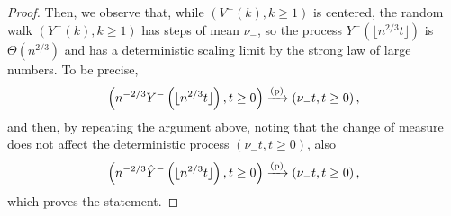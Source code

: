 \begin{proof}
 Then, we observe that, while $(V^-(k),k\geq 1)$ is centered, the random walk  $(Y^-(k),k\geq 1)$ has steps of mean $\nu_-$, so the process $Y^-\left(\lfloor n^{2/3}t\rfloor\right)$  is $\Theta(n^{2/3})$ and has a deterministic scaling limit by the strong law of large numbers. To be precise,
 $$\left(n^{-2/3}Y^-\left(\lfloor n^{2/3}t\rfloor\right),t\geq 0\right)\xrightarrow[]{\mathrm{(p)}}\left(\nu_- t,t\geq 0\right),$$
 and then, by repeating the argument above, noting that the change of measure does not affect the deterministic process $(\nu_- t,t\geq 0)$, also 
 $$\left(n^{-2/3}\hat{Y}^-\left(\lfloor n^{2/3}t\rfloor\right),t\geq 0\right)\xrightarrow[]{\mathrm{(p)}}\left(\nu_- t,t\geq 0\right),$$
 which proves the statement.
 \end{proof}
